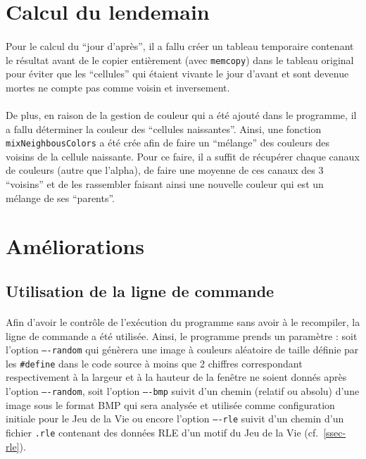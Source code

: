 \documentclass{report}
\begin{document}
\section{Calcul du lendemain}

\paragraph{} Pour le calcul du ``jour d'après'', il a fallu créer un tableau
temporaire contenant le résultat avant de le copier entièrement (avec
\lstinline[style=prog]|memcopy|) dans le tableau original pour éviter que les
``cellules'' qui étaient vivante le jour d'avant et sont devenue mortes ne
compte pas comme voisin et inversement.

\paragraph{} De plus, en raison de la gestion de couleur qui a été ajouté dans
le programme, il a fallu déterminer la couleur des ``cellules naissantes''.
Ainsi, une fonction \lstinline[style=prog]|mixNeighbousColors| a été crée afin
de faire un ``mélange'' des couleurs des voisins de la cellule naissante. Pour
ce faire, il a suffit de récupérer chaque canaux de couleurs (autre que
l'alpha), de faire une moyenne de ces canaux des 3 ``voisins'' et de les
rassembler faisant ainsi une nouvelle couleur qui est un mélange de ses
``parents''.

\section{Améliorations}

\subsection{Utilisation de la ligne de commande}

\paragraph{} Afin d'avoir le contrôle de l'exécution du programme sans avoir à
le recompiler, la ligne de commande a été utilisée. Ainsi, le programme prends
un paramètre : soit l'option \texttt{----random} qui génèrera une image à
couleurs aléatoire de taille définie par les \lstinline[style=prog]|#define|
dans le code source à moins que 2 chiffres correspondant respectivement à la
largeur et à la hauteur de la fenêtre ne soient donnés après l'option
\texttt{----random}, soit l'option \texttt{----bmp} suivit d'un chemin
(relatif ou absolu) d'une image sous le format BMP qui sera analysée et
utilisée comme configuration initiale pour le Jeu de la Vie ou encore l'option
\texttt{----rle} suivit d'un chemin d'un fichier \texttt{.rle} contenant des
données RLE d'un motif du Jeu de la Vie (cf.~\ref{ssec-rle}).
\end{document}
